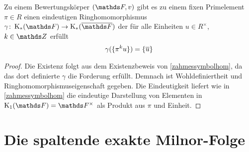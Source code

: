 \documentclass[ngerman,fontsize=11pt, paper=a4, parskip=half, titlepage=true, toc=bib]{scrartcl}
\begin{document}
\begin{Kor}
  Zu einem Bewertungskörper $(\F,v)$ gibt es zu einem fixen
  Primelement $\pi\in R$ einen eindeutigen Ringhomomorphismus 
  $\gamma\colon\KF\to\KbF$ der für alle Einheiten $u\in R^\times$, 
  $k\in\Z$ erfüllt
  \begin{gather*}
    \gamma(\{\pi^ku\})=\{\overline u\}
  \end{gather*}

  \begin{proof}
    Die Existenz folgt aus dem Existenzbeweis von
    \ref{zahmessymbolhom}, da das dort definierte $\gamma$ die
    Forderung erfüllt.
    Demnach ist Wohldefiniertheit und
    Ringhomomorphismuseigenschaft gegeben.
    Die Eindeutigkeit liefert wie in \ref{zahmessymbolhom}
    die eindeutige Darstellung von Elementen in $\KoF=\Fx$ 
    als Produkt aus $\pi$ und Einheit.
  \end{proof}
\end{Kor}



\section{Die spaltende exakte Milnor-Folge}
\cite[][Theorem 2.3]{milnor}



\printindex

\nocite{*}
\printbibliography
\end{document}
